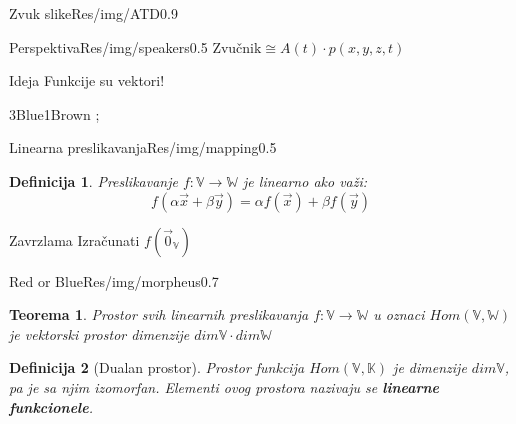 \documentclass{beamer}
\newtheorem*{teo}{Teorema}
\newtheorem*{df}{Definicija}
\newenvironment{thinker}{\begin{alertblock}{Zavrzlama}}{\end{alertblock}}
\newenvironment{idea}{\begin{block}{Ideja}}{\end{block}}
\begin{document}
    \begin{framebg}{Zvuk slike}{Res/img/ATD}{0.9}
    \end{framebg}
    \begin{framebg}{Perspektiva}{Res/img/speakers}{0.5}
        $\text{Zvučnik} \cong A(t) \cdot p(x, y, z, t)$
        \begin{idea}
            Funkcije su vektori!
        \end{idea}
    \end{framebg}
    \begin{frame}{3Blue1Brown}
         ;
    \end{frame}
    \begin{framebg}{Linearna preslikavanja}{Res/img/mapping}{0.5}
        \begin{df}
            Preslikavanje $f : \mathbb V \to \mathbb W$ je linearno ako važi:
            $$f(\alpha \vec x + \beta \vec y) = \alpha f(\vec x) + \beta f(\vec y)$$
        \end{df}
        \begin{thinker}
            Izračunati $f(\vec 0_{\mathbb V})$
        \end{thinker}
    \end{framebg}
    \begin{framebg}{Red or Blue}{Res/img/morpheus}{0.7}
        \begin{teo}
            Prostor svih linearnih preslikavanja $f : \mathbb V \to \mathbb W$ u oznaci
            $Hom(\mathbb V, \mathbb W)$ je vektorski
            prostor dimenzije $dim \mathbb V \cdot dim \mathbb W$
        \end{teo}
        \begin{df}[Dualan prostor]
            Prostor funkcija $Hom(\mathbb V, \mathbb K)$ je dimenzije $dim \mathbb V$,
            pa je sa njim izomorfan. Elementi ovog prostora nazivaju se \textbf{linearne funkcionele}.
        \end{df}
    \end{framebg}
\end{document}
